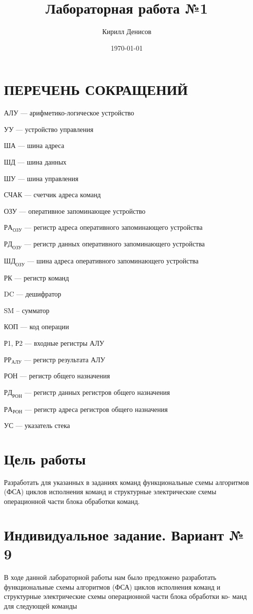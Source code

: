\documentclass[a4paper,14pt]{extarticle}
\author{Кирилл Денисов}
\title{Лабораторная работа №1}
\date{\today}
\newcommand{\pathToCommonFolder}{/home/denilai/Documents/repos/latex/Common}
\def\myformat#1{\hfil #1\hfil}
\begin{document}
	\thispagestyle{empty}
	
	\newpage
	\newpage
	
	\section*{\myformat{ПЕРЕЧЕНЬ СОКРАЩЕНИЙ}}	
	АЛУ --- арифметико-логическое устройство
	
	УУ --- устройство управления
	
	ША --- шина адреса
	
	ШД --- шина данных
	
	ШУ --- шина управления
	
	СЧАК --- счетчик адреса команд
	
	ОЗУ  --- оперативное запоминающее устройство
	
	$РА_{ОЗУ}$ --- регистр адреса оперативного запоминающего устройства
	
	$РД_{ОЗУ}$ --- регистр данных оперативного запоминающего устройства
	
	$ШД_{ОЗУ}$ --- шина адреса оперативного запоминающего устройства
	
	РК  --- регистр команд
	
	
	DC  --- дешифратор
	
	SM -- сумматор
	
	КОП --- код операции
	
	Р1, Р2 --- входные регистры АЛУ
	
	$РР_{АЛУ}$ --- регистр результата АЛУ
	
	РОН --- регистр общего назначения
	
	
	$РД_{РОН}$  --- регистр данных регистров общего назначения
	
	$РА_{РОН}$  --- регистр адреса регистров общего назначения
	
	УС --- указатель стека
	
\newpage
\section*{Цель работы}
Разработать для указанных в заданиях команд функциональные схемы
алгоритмов (ФСА) циклов исполнения команд и структурные электрические
схемы операционной части блока обработки команд.
\section*{Индивидуальное задание. Вариант № 9}
В ходе данной лабораторной работы нам было предложено разработать
функциональные схемы алгоритмов (ФСА) циклов исполнения команд и
структурные электрические схемы операционной части блока обработки ко-
манд для следующей команды
\end{document}
